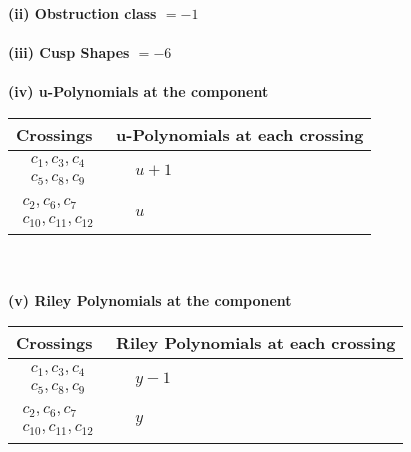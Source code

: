 \documentclass[1p]{elsarticle_modified}
\theoremstyle{definition}
\begin{document}
\flushleft \textbf{(ii) Obstruction class $= -1$}\\~\\
\flushleft \textbf{(iii) Cusp Shapes $= -6$}\\~\\
\newpage\renewcommand{\arraystretch}{1}
\flushleft \textbf{(iv) u-Polynomials at the component}\newline \\
\begin{tabular}{m{50pt}|m{274pt}}
Crossings & \hspace{64pt}u-Polynomials at each crossing \\
\hline $$\begin{aligned}c_{1},c_{3},c_{4}\\c_{5},c_{8},c_{9}\end{aligned}$$&$\begin{aligned}
&u+1
\end{aligned}$\\
\hline $$\begin{aligned}c_{2},c_{6},c_{7}\\c_{10},c_{11},c_{12}\end{aligned}$$&$\begin{aligned}
&u
\end{aligned}$\\
\hline
\end{tabular}\\~\\
\newpage\renewcommand{\arraystretch}{1}
\flushleft \textbf{(v) Riley Polynomials at the component}\newline \\
\begin{tabular}{m{50pt}|m{274pt}}
Crossings & \hspace{64pt}Riley Polynomials at each crossing \\
\hline $$\begin{aligned}c_{1},c_{3},c_{4}\\c_{5},c_{8},c_{9}\end{aligned}$$&$\begin{aligned}
&y-1
\end{aligned}$\\
\hline $$\begin{aligned}c_{2},c_{6},c_{7}\\c_{10},c_{11},c_{12}\end{aligned}$$&$\begin{aligned}
&y
\end{aligned}$\\
\hline
\end{tabular}\\~\\
\end{document}
